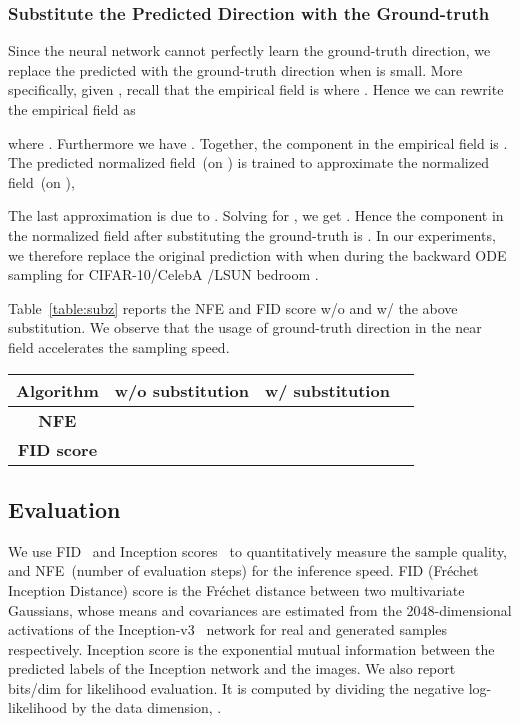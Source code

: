 \subsubsection{Substitute the Predicted  Direction with the Ground-truth}
\label{app:sub}
Since the neural network cannot perfectly learn the ground-truth  direction, we replace the predicted  with the ground-truth direction when  is small. More specifically, given , recall that the empirical field is  where . Hence we can rewrite the empirical field as 

where . Furthermore we have . Together, the  component in the empirical field is .
The predicted normalized field~(on ) is trained to approximate the normalized field~(on ), \ie 

The last approximation is due to . Solving for , we get . Hence the  component in the normalized field after substituting the ground-truth is . In our experiments, we therefore replace the original prediction  with  when  during the backward ODE sampling for CIFAR-10/CelebA /LSUN bedroom . 

Table~\ref{table:subz} reports the NFE and FID score w/o and w/ the above substitution. We observe that the usage of ground-truth  direction in the near field accelerates the sampling speed.

\begin{table*}[htb]
\begin{center}
\caption{NFE and FID scores of w/ and w/o substitution}
\label{table:subz}
\begin{tabular}{c c c c}
		\toprule
		\textbf{Algorithm} &  w/o substitution &w/ substitution\\
		\midrule
        \textbf{NFE} &   & \\
        \textbf{FID score} &  &  \\
        \bottomrule
\end{tabular}
\end{center}
\end{table*}

\subsection{Evaluation}

We use FID~\cite{Heusel2017GANsTB} and Inception scores~\cite{Salimans2016ImprovedTF} to quantitatively measure the sample quality, and NFE~(number of evaluation steps) for the inference speed. {FID (Fréchet Inception Distance) score is the Fréchet distance between two multivariate Gaussians, whose means and covariances are estimated from the 2048-dimensional activations of the Inception-v3~\citep{Szegedy2016RethinkingTI} network for real and generated samples respectively.} Inception score is the exponential mutual information between the predicted labels of the Inception network and the images. We also report bits/dim for likelihood evaluation. It is computed by dividing the negative log-likelihood by the data dimension, \ie .

